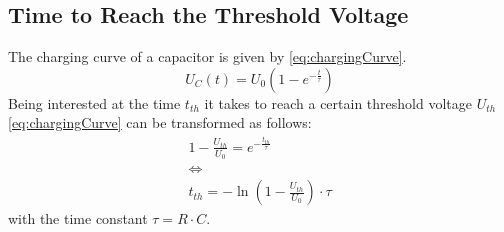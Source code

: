     \subsection{Time to Reach the Threshold Voltage}\label{sec:preparation_task_6}
        The charging curve of a capacitor is given by \cref{eq:chargingCurve}.
        \begin{equation}
            U_C(t) = U_0 ( 1-e^{-\frac{t}{\tau}})
            \label{eq:chargingCurve}
        \end{equation}
        Being interested at the time \( t_{th} \) it takes to reach a certain threshold voltage \( U_{th} \) \cref{eq:chargingCurve}
        can be transformed as follows:
        \begin{gather}
            1- \frac{U_{th}}{U_0} = e^{-\frac{t_{th}}{\tau}} \nonumber \\
            \Leftrightarrow \nonumber \\
            t_{th} = - \ln\left(1- \frac{U_{th}}{U_0}\right) \cdot \tau
            \label{eq:timeToThresholfVoltage}
        \end{gather}
        with the time constant \( \tau = R \cdot C \).
